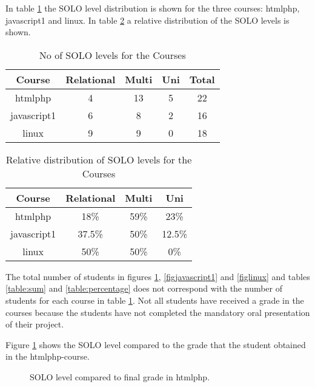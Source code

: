 \documentclass[twoside,twocolumn,a4paper,11pt,english]{article}
\begin{document}
In table \ref{table:solo} the SOLO level distribution is shown for the three courses: htmlphp, javascript1 and linux. In table \ref{table:solorelative} a relative distribution of the SOLO levels is shown.

\begin{table}[H]
\caption{No of SOLO levels for the Courses}
\centering
\begin{tabular}{c | c c c | c}
Course & Relational & Multi & Uni & Total  \\ [0.5ex] %
\hline
htmlphp & 4 & 13 & 5 & 22 \\
javascript1 & 6 & 8 & 2 & 16\\
linux & 9 & 9 & 0 & 18 \\
\end{tabular}
\label{table:solo}
\end{table}

\begin{table}[H]
\caption{Relative distribution of SOLO levels for the Courses}
\centering
\begin{tabular}{c | c c c}
Course & Relational & Multi & Uni \\ [0.5ex] %
\hline
htmlphp & 18\% & 59\% & 23\% \\
javascript1 & 37.5\% & 50\% & 12.5\%\\
linux & 50\% & 50\% & 0\%\\ [1ex]
\end{tabular}
\label{table:solorelative}
\end{table}

The total number of students in figures \ref{fightmlphp}, \ref{figjavascript1} and \ref{figlinux} and tables \ref{table:sum} and \ref{table:percentage} does not correspond with the number of students for each course in table \ref{table:solo}. Not all students have received a grade in the courses because the students have not completed the mandatory oral presentation of their project.

Figure \ref{fightmlphp} shows the SOLO level compared to the grade that the student obtained in the htmlphp-course.

\begin{figure}[H]
\caption{SOLO level compared to final grade in htmlphp.}
\label{fightmlphp}
\end{figure}
\end{document}
